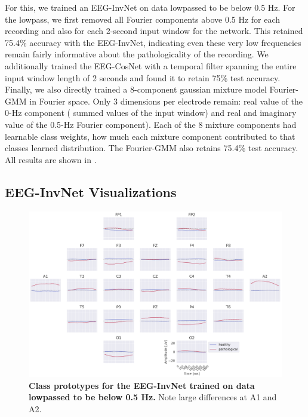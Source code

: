     For this, we trained an EEG-InvNet on data lowpassed to be below 0.5 Hz.
For the lowpass, we first removed all Fourier components above 0.5 Hz
for each recording and also for each 2-second input window for the
network. This retained 75.4\% accuracy with the EEG-InvNet, indicating
even these very low frequencies remain fairly informative about the
pathologicality of the recording. We additionally trained the EEG-CosNet
with a temporal filter spanning the entire input window length of 2
seconds and found it to retain 75\% test accuracy. Finally, we also
directly trained a 8-component gaussian mixture model Fourier-GMM in
Fourier space. Only 3 dimensions per electrode remain: real value of the
0-Hz component ( summed values of the input window) and real and
imaginary value of the 0.5-Hz Fourier component). Each of the 8 mixture
components had learnable class weights, how much each mixture component
contributed to that classes learned distribution. The Fourier-GMM also
retains 75.4\% test accuracy. All results are shown in
.

\subsection{EEG-InvNet
Visualizations}\label{eeg-invnet-visualizations}

\begin{figure}[h!tb]
    \myfloatalign
    \includegraphics[width=.9\linewidth]{images/net-lowfreq-prototypes.png}
    \caption[EEG-InvNet low-frequency class prototypes]{
\textbf{Class prototypes for the EEG-InvNet trained on data lowpassed to
be below 0.5 Hz.} Note large differences at A1 and A2.
}
\label{net-low-freq-prototypes-fig}
\end{figure}


